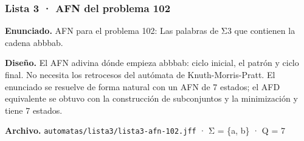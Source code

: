 
\hypertarget{lista-3-afn-del-problema-102}{%
\subsubsection{Lista 3 · AFN del problema 102}\label{lista-3-afn-del-problema-102}}

\textbf{Enunciado.} AFN para el problema 102: Las palabras de Σ3 que contienen la cadena abbbab.

\textbf{Diseño.} El AFN adivina dónde empieza abbbab: ciclo inicial, el patrón y ciclo final. No necesita los retrocesos del autómata de Knuth-Morris-Pratt. El enunciado se resuelve de forma natural con un AFN de 7 estados; el AFD equivalente se obtuvo con la construcción de subconjuntos y la minimización y tiene 7 estados.

\textbf{Archivo.} \texttt{automatas/lista3/lista3-afn-102.jff} · Σ = \{a, b\} · \textbar Q\textbar{} = 7

